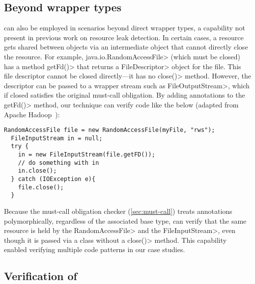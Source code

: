 
\subsection{Beyond wrapper types}

\MustCallAlias can also be employed in scenarios beyond direct wrapper types, a
capability not present in previous work on resource leak detection.  In certain cases, a resource gets
shared between objects via an intermediate object that cannot directly close the
resource.  For example, \<java.io.RandomAccessFile> (which must be closed) has
a method \<getFd()> that returns a \<FileDescriptor>
object for the file. This file
descriptor cannot be closed directly---it has no \<close()> method.
However, the descriptor can be passed to a wrapper stream such as
\<FileOutputStream>, which if closed satisfies the original must-call
obligation.  By adding \MustCallAlias annotations to the \<getFd()> method, our
technique can verify code like the below (adapted from Apache Hadoop~\cite{hadoop-random-access-file}):
\begin{lstlisting}[frame=tb,belowskip=3mm]
  RandomAccessFile file = new RandomAccessFile(myFile, "rws");
  FileInputStream in = null;
  try {
    in = new FileInputStream(file.getFD());
    // do something with in  
    in.close();
  } catch (IOException e){
    file.close();
  }
\end{lstlisting}
Because the must-call obligation checker (\cref{sec:must-call})
treats \MustCallAlias annotations
polymorphically, regardless of the associated base type,
\tool can verify that the same resource is held by
the \<Random\-Access\-File> and the \<File\-Input\-Stream>, even though it
is passed via a class without a \<close()> method.
This capability enabled
verifying multiple code patterns in our case studies.

\subsection{Verification of \MustCallAlias}\label{sec:MustCallAlias-verification}

